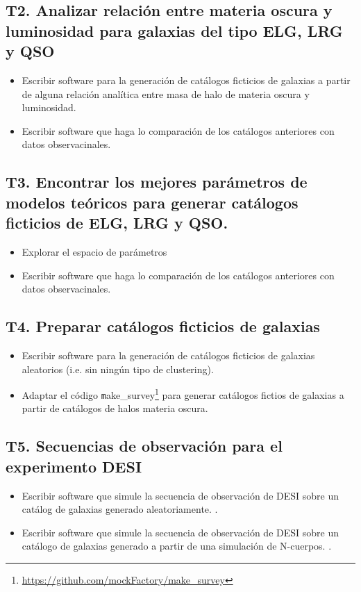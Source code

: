 \subsection*{T2. Analizar relaci\'on entre materia oscura y luminosidad para galaxias del tipo ELG, LRG y QSO}
\begin{itemize}
\item[T4.1] \gradA\prof 
  Escribir software para la generaci\'on de cat\'alogos
  ficticios de galaxias a partir de alguna relaci\'on anal\'itica
  entre masa de halo de materia oscura y luminosidad.

\item[T4.2] \gradA\prof 
  Escribir software que haga lo comparaci\'on de los cat\'alogos
  anteriores con datos observacinales.
\end{itemize}

\subsection*{T3. Encontrar los mejores par\'ametros de modelos
  te\'oricos para generar cat\'alogos ficticios de ELG, LRG y QSO.}
\begin{itemize}
\item[T4.1] \gradA\prof 
Explorar el espacio de par\'ametros 
\item[T4.2] \gradA\prof 
  Escribir software que haga lo comparaci\'on de los cat\'alogos
  anteriores con datos observacinales.
\end{itemize}


\subsection*{T4. Preparar cat\'alogos ficticios de galaxias}
\begin{itemize}
\item[T4.1] \gradA\prof Escribir software para la generaci\'on de cat\'alogos
  ficticios de galaxias aleatorios (i.e. sin ning\'un tipo de
  clustering). 
\item[T4.2] \gradA\prof Adaptar el c\'odigo {\texttt
  make\_survey}\footnote{\url{https://github.com/mockFactory/make_survey}}
  para generar  cat\'alogos fictios de galaxias a partir de
  cat\'alogos de halos materia oscura. 
\end{itemize}

\subsection*{T5. Secuencias de observaci\'on para el experimento DESI}
\begin{itemize}
\item[T5.1] \prof Escribir software que simule la secuencia de observaci\'on
  de DESI sobre un cat\'alog de galaxias generado aleatoriamente. \bob.
\item[T5.2] \prof Escribir software que simule la secuencia de observaci\'on
  de DESI sobre un cat\'alogo de galaxias generado a partir de una
  simulaci\'on de N-cuerpos. \bob.
\end{itemize}

